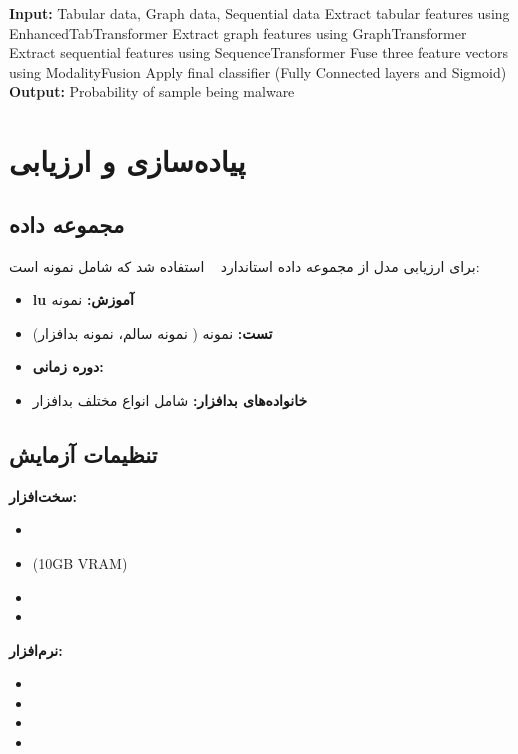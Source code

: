 \documentclass[a4paper,oneside,12pt]{report}
\theoremstyle{definition}
\begin{document}
\begin{algorithm}[!htbp]
\caption{Final MAGNET Model}
\label{alg:final_magnet}
\begin{algorithmic}[1]
\STATE \textbf{Input:} Tabular data, Graph data, Sequential data
\STATE Extract tabular features using EnhancedTabTransformer
\STATE Extract graph features using GraphTransformer
\STATE Extract sequential features using SequenceTransformer
\STATE Fuse three feature vectors using ModalityFusion
\STATE Apply final classifier (Fully Connected layers and Sigmoid)
\STATE \textbf{Output:} Probability of sample being malware
\end{algorithmic}
\end{algorithm}

\section{پیاده‌سازی و ارزیابی}
\subsection{مجموعه داده}
برای ارزیابی مدل  از مجموعه داده استاندارد ~\cite{Drebin} استفاده شد که شامل  نمونه است:
\begin{itemize}
  \item \textbf{lu آموزش:}  نمونه
  \item \textbf{تست:}  نمونه ( نمونه سالم،  نمونه بدافزار)
  \item \textbf{دوره زمانی:} 
  \item \textbf{خانواده‌های بدافزار:} شامل انواع مختلف بدافزار
\end{itemize}

\subsection{تنظیمات آزمایش}
\textbf{سخت‌افزار:}
\begin{itemize}
  \item {}
  \item {} (10GB VRAM)
  \item {}
  \item {}
\end{itemize}

\textbf{نرم‌افزار:}
\begin{itemize}
  \item {}
  \item {}
  \item {}
  \item {}
\end{itemize}
\end{document}
